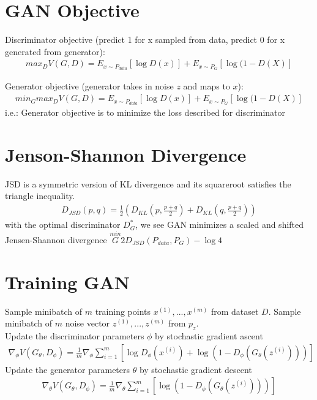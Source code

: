 \section{GAN Objective} 
Discriminator objective (predict 1 for x sampled from data, predict 0 for x generated from generator): 
    \begin{align*}
        max_{D} V(G,D) = E_{x\sim P_{data}}[\log D(x)] + E_{x\sim P_G}[\log(1-D(X)]
    \end{align*}

Generator objective (generator takes in noise $z$ and maps to $x$):
    \begin{align*}
        min_{G} max_{D}V(G,D) = E_{x\sim P_{data}}[\log D(x)] + E_{x\sim P_G}[\log(1-D(X)]
    \end{align*}
i.e.: Generator objective is to minimize the loss described for discriminator

\section{Jenson-Shannon Divergence} 
JSD is a symmetric version of KL divergence and its squareroot satisfies the triangle inequality. 
    \begin{align*}
        D_{JSD}(p,q) = \frac{1}{2}(D_{KL}(p, \frac{p + q}{2}) + D_{KL}(q, \frac{p+q}{2}))
    \end{align*}
with the optimal discriminator $D_G^*$, we see GAN minimizes a scaled and shifted Jensen-Shannon divergence $ \overset{min}{G} 2D_{JSD}(P_{data}, P_G) - \log 4$

\section{Training GAN}
Sample minibatch of $m$ training points $x^{(1)}, ..., x^{(m)}$ from dataset $D$. Sample minibatch of $m$ noise vector $z^{(1)}, ..., z^{(m)}$ from $p_z$. \\
Update the discriminator parameters $\phi$ by stochastic gradient ascent 
    \begin{align*}
        \nabla_\phi V(G_\theta, D_\phi) = \frac{1}{m} \nabla_\phi \sum_{i=1}^m [\log D_\phi(x^{(i)}) + \log (1 - D_\phi(G_\theta(z^{(i)})))]
    \end{align*}
Update the generator parameters $\theta$ by stochastic gradient descent 
    \begin{align*}
        \nabla_\theta V(G_\theta, D_\phi) = \frac{1}{m} \nabla_\theta \sum_{i=1}^m [\log (1 - D_\phi(G_\theta(z^{(i)})))]
    \end{align*}

